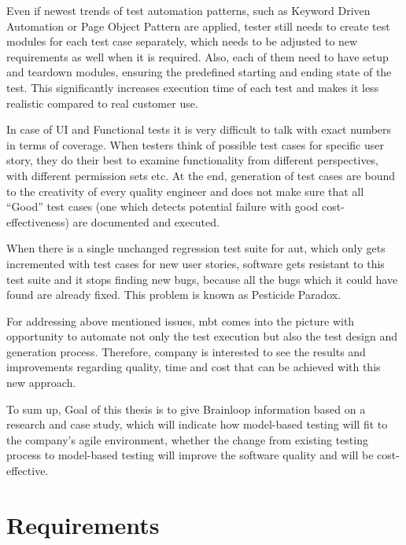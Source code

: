 \par
Even if newest trends of test automation patterns, such as Keyword Driven Automation or Page Object Pattern are applied, tester still needs to create test modules for each test case separately, which needs to be adjusted to new requirements as well when it is required. Also, each of them need to have setup and teardown modules, ensuring the predefined starting and ending state of the test. This significantly increases execution time of each test and makes it less realistic compared to real customer use.

\par
In case of UI and Functional tests it is very difficult to talk with exact numbers in terms of coverage. When testers think of possible test cases for specific user story, they do their best to examine functionality from different perspectives, with different permission sets etc. At the end, generation of test cases are bound to the creativity of every quality engineer and does not make sure that all “Good” test cases (one which detects potential failure with good cost-effectiveness) are documented and executed.

\par
When there is a single unchanged regression test suite for \acrlong{aut}, which only gets incremented with test cases for new user stories, software gets resistant to this test suite and it stops finding new bugs, because all the bugs which it could have found are already fixed. This problem is known as Pesticide Paradox.

\par
For addressing above mentioned issues, \acrlong{mbt} comes into the picture with opportunity to automate not only the test execution but also the test design and generation process. Therefore, company is interested to see the results and improvements regarding quality, time and cost that can be achieved with this new approach.

\par
To sum up, Goal of this thesis is to give Brainloop information based on a research and case study, which will indicate how model-based testing will fit to the company’s agile environment, whether the change from existing testing process to model-based testing will improve the software quality and will be cost-effective.

\section{Requirements}

